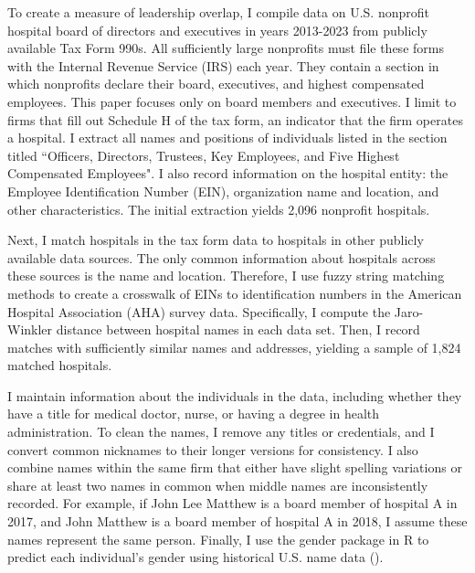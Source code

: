 \documentclass[12pt]{article}
\begin{document}
    
   To create a measure of leadership overlap, I compile data on U.S. nonprofit hospital board of directors and executives in years 2013-2023 from publicly available Tax Form 990s. All sufficiently large nonprofits must file these forms with the Internal Revenue Service (IRS) each year. They contain a section in which nonprofits declare their board, executives, and highest compensated employees. This paper focuses only on board members and executives. I limit to firms that fill out Schedule H of the tax form, an indicator that the firm operates a hospital. I extract all names and positions of individuals listed in the section titled ``Officers, Directors, Trustees, Key Employees, and Five Highest Compensated Employees". I also record information on the hospital entity: the Employee Identification Number (EIN), organization name and location, and other characteristics. The initial extraction yields 2,096 nonprofit hospitals.

   Next, I match hospitals in the tax form data to hospitals in other publicly available data sources. The only common information about hospitals across these sources is the name and location. Therefore, I use fuzzy string matching methods to create a crosswalk of EINs to identification numbers in the American Hospital Association (AHA) survey data. Specifically, I compute the Jaro-Winkler distance between hospital names in each data set. Then, I record matches with sufficiently similar names and addresses, yielding a sample of 1,824 matched hospitals. 

    I maintain information about the individuals in the data, including whether they have a title for medical doctor, nurse, or having a degree in health administration. To clean the names, I remove any titles or credentials, and I convert common nicknames to their longer versions for consistency. I also combine names within the same firm that either have slight spelling variations or share at least two names in common when middle names are inconsistently recorded. For example, if John Lee Matthew is a board member of hospital A in 2017, and John Matthew is a board member of hospital A in 2018, I assume these names represent the same person. Finally, I use the gender package in R to predict each individual's gender using historical U.S. name data (\cite{gender}). 
\end{document}
